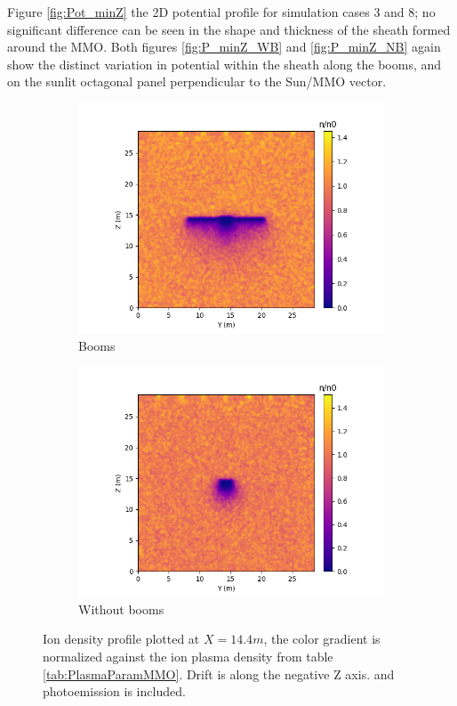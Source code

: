 Figure \ref{fig:Pot_minZ} the 2D potential profile for simulation cases 3 and 8; no significant difference can be seen in the shape and thickness of the sheath formed around the MMO. Both figures \ref{fig:P_minZ_WB} and \ref{fig:P_minZ_NB} again show the distinct variation in potential within the sheath along the booms, and on the sunlit octagonal panel perpendicular to the Sun/MMO vector. 

\begin{figure}[H]
  \begin{subfigure}[b]{0.6\textwidth}
  \includegraphics[width=\textwidth]{figures/MMO/minZ/WB/I_minZ_WB.png}
  \caption{Booms}
  \label{fig:I_minZ_WB}
\end{subfigure}
\begin{subfigure}[b]{0.6\textwidth}
  \includegraphics[width=\textwidth]{figures/MMO/minZ/NB/I_minZ_NB.png}
  \caption{Without booms}
  \label{fig:I_minZ_NB}
\end{subfigure}
\caption{Ion density profile plotted at $X = 14.4 m$, the color gradient is normalized against the ion plasma density from table \ref{tab:PlasmaParamMMO}. Drift is along the negative Z axis. and photoemission is included.}
\label{fig:Ion_minZ}
\end{figure}

